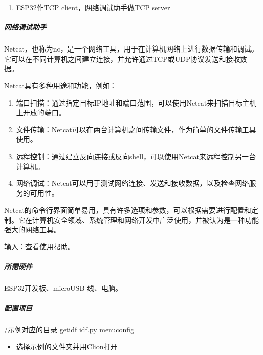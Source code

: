 \documentclass[a4paper,12pt,english]{sphinxmanual}
\begin{document}
{{\begin{enumerate}
\item {} 
\sphinxAtStartPar
ESP32作TCP client，网络调试助手做TCP server

\end{enumerate}


\subparagraph{网络调试助手}
\label{\detokenize{exp-esp32/socket/tcp:netcat}}
\sphinxAtStartPar
Netcat，也称为nc，是一个网络工具，用于在计算机网络上进行数据传输和调试。它可以在不同计算机之间建立连接，并允许通过TCP或UDP协议发送和接收数据。

\sphinxAtStartPar
Netcat具有多种用途和功能，例如：
\begin{enumerate}
%
\item {} 
\sphinxAtStartPar
端口扫描：通过指定目标IP地址和端口范围，可以使用Netcat来扫描目标主机上开放的端口。

\item {} 
\sphinxAtStartPar
文件传输：Netcat可以在两台计算机之间传输文件，作为简单的文件传输工具使用。

\item {} 
\sphinxAtStartPar
远程控制：通过建立反向连接或反向shell，可以使用Netcat来远程控制另一台计算机。

\item {} 
\sphinxAtStartPar
网络调试：Netcat可以用于测试网络连接、发送和接收数据，以及检查网络服务的可用性。

\end{enumerate}

\sphinxAtStartPar
Netcat的命令行界面简单易用，具有许多选项和参数，可以根据需要进行配置和定制。它在计算机安全领域、系统管理和网络开发中广泛使用，并被认为是一种功能强大的网络工具。

\sphinxAtStartPar
输入：查看使用帮助。


\subparagraph{所需硬件}
\label{\detokenize{exp-esp32/socket/tcp:id2}}
\sphinxAtStartPar
ESP32开发板、microUSB 线、电脑。


\subparagraph{配置项目}
\label{\detokenize{exp-esp32/socket/tcp:id3}}
\sphinxAtStartPar
{}

\begin{sphinxVerbatim}[commandchars=\\\{\}]
 /示例对应的目录
get\PYGZhy{}idf
idf.py menuconfig
\end{sphinxVerbatim}

\sphinxAtStartPar
{}
\begin{itemize}
\item {} 
\sphinxAtStartPar
选择示例的文件夹并用Clion打开


\end{itemize}}}
\end{document}
